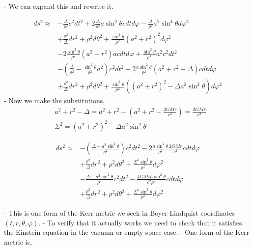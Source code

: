 - We can expand this and rewrite it.

\begin{align}
    d s^2 \approx & -\frac{\Delta}{\rho^2} c^2 d t^2+2 \frac{\Delta}{\rho^2} a \sin ^2 \theta c d t d \varphi-\frac{\Delta}{\rho^2} a^2 \sin ^4 \theta d \varphi^2               \\
                  & +\frac{\rho^2}{\Delta} d r^2+\rho^2 d \theta^2+\frac{\sin ^2 \theta}{\rho^2}\left(a^2+r^2\right)^2 d \varphi^2                                               \\
                  & -2 \frac{\sin ^2 \theta}{\rho^2}\left(a^2+r^2\right) a c d t d \varphi+\frac{\sin ^2 \theta}{\rho^2} a^2 c^2 d t^2                                           \\
    =             & -\left(\frac{\Delta}{\rho^2}-\frac{\sin ^2 \theta}{\rho^2} a^2\right) c^2 d t^2-2 \frac{a \sin ^2 \theta}{\rho^2}\left(a^2+r^2-\Delta\right) c d t d \varphi \\
                  & +\frac{\rho^2}{\Delta} d r^2+\rho^2 d \theta^2+\frac{\sin ^2 \theta}{\rho^2}\left(\left(a^2+r^2\right)^2-\Delta a^2 \sin ^2 \theta\right) d \varphi^2
\end{align}
- Now we make the substitutions,
\begin{align}
     & a^2+r^2-\Delta=a^2+r^2-\left(a^2+r^2-\frac{2 G M r}{c^2}\right)=\frac{2 G M r}{c^2} \\
     & \Sigma^2=\left(a^2+r^2\right)^2-\Delta a^2 \sin ^2 \theta
\end{align}

\begin{align}
    d s^2 \approx & -\left(\frac{\Delta-a^2 \sin ^2 \theta}{\rho^2}\right) c^2 d t^2-2 \frac{a \sin ^2 \theta}{\rho^2} \frac{2 G M r}{c^2} c d t d \varphi \\
                  & +\frac{\rho^2}{\Delta} d r^2+\rho^2 d \theta^2+\frac{\Sigma^2 \sin ^2 \theta}{\rho^2} d \varphi^2                                      \\
    =             & -\frac{\Delta-a^2 \sin ^2 \theta}{\rho^2} c^2 d t^2-\frac{4 G M r a \sin ^2 \theta}{c^2 \rho^2} c d t d \varphi                        \\
                  & +\frac{\rho^2}{\Delta} d r^2+\rho^2 d \theta^2+\frac{\Sigma^2 \sin ^2 \theta}{\rho^2} d \varphi^2
\end{align}


- This is one form of the Kerr metric we seek in Boyer-Lindquist coordinates $(t, r, \theta, \varphi)$.
- To verify that it actually works we need to check that it satisfies the Einstein equation in the vacuum or empty space case.
- One form of the Kerr metric is,

